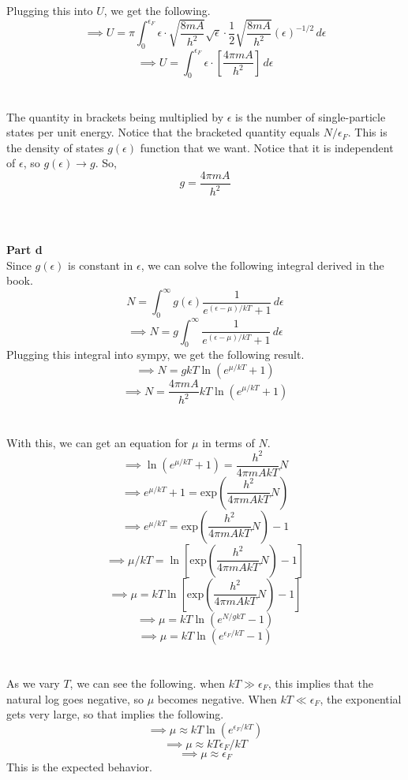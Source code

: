 \documentclass[12pt]{article}
\begin{document}
\begin{flushleft}
Plugging this into $U$, we get the following.
$$\implies U=\pi\int_0^{\epsilon_F}\epsilon\cdot\sqrt{\frac{8mA}{h^2}}\sqrt{\epsilon}\cdot\frac{1}{2}\sqrt{\frac{8mA}{h^2}}(\epsilon)^{-1/2}\,d\epsilon$$
$$\implies U=\int_0^{\epsilon_F}\epsilon\cdot\left[\frac{4\pi mA}{h^2}\right]\,d\epsilon$$\\~\\

The quantity in brackets being multiplied by $\epsilon$ is the number of single-particle states per unit energy.
Notice that the bracketed quantity equals $N/\epsilon_F$.
This is the density of states $g(\epsilon)$ function that we want.
Notice that it is independent of $\epsilon$, so $g(\epsilon)\rightarrow g$.
So,
$$g=\frac{4\pi mA}{h^2}$$\\~\\~\\



\textbf{Part d}\\
Since $g(\epsilon)$ is constant in $\epsilon$, we can solve the following integral derived in the book.
$$N=\int_0^\infty g(\epsilon)\frac{1}{e^{(\epsilon-\mu)/kT}+1}\,d\epsilon$$
$$\implies N=g\int_0^\infty\frac{1}{e^{(\epsilon-\mu)/kT}+1}\,d\epsilon$$
Plugging this integral into sympy, we get the following result.
$$\implies N=gkT\ln(e^{\mu/kT} + 1)$$
$$\implies N=\frac{4\pi mA}{h^2}kT\ln(e^{\mu/kT} + 1)$$\\~\\

With this, we can get an equation for $\mu$ in terms of $N$.
$$\implies \ln(e^{\mu/kT}+1)=\frac{h^2}{4\pi mAkT}N$$
$$\implies e^{\mu/kT}+1=\text{exp}\left(\frac{h^2}{4\pi mAkT}N\right)$$
$$\implies e^{\mu/kT}=\text{exp}\left(\frac{h^2}{4\pi mAkT}N\right)-1$$
$$\implies \mu/kT=\ln\left[\text{exp}\left(\frac{h^2}{4\pi mAkT}N\right)-1\right]$$
$$\implies \mu=kT\ln\left[\text{exp}\left(\frac{h^2}{4\pi mAkT}N\right)-1\right]$$
$$\implies \mu=kT\ln\left(e^{N/gkT}-1\right)$$
$$\implies \mu=kT\ln\left(e^{\epsilon_F/kT}-1\right)$$\\~\\

As we vary $T$, we can see the following.
when $kT\gg\epsilon_F$, this implies that the natural log goes negative, so $\mu$ becomes negative.
When $kT\ll\epsilon_F$, the exponential gets very large, so that implies the following.
$$\implies \mu\approx kT\ln\left(e^{\epsilon_F/kT}\right)$$
$$\implies \mu\approx kT\epsilon_F/kT$$
$$\implies \mu\approx \epsilon_F$$
This is the expected behavior.\\~\\




\end{flushleft}
\end{document}
